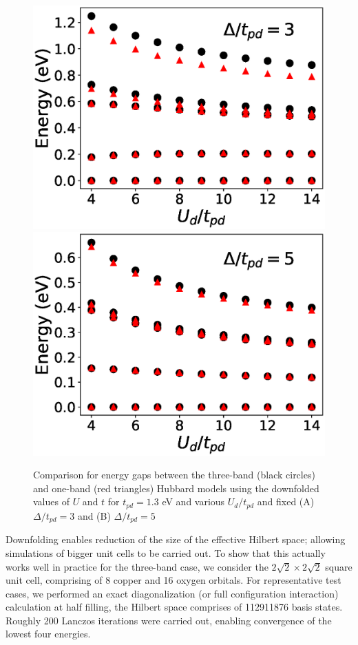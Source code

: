 \begin{figure}
\centering
\includegraphics[width=0.49\linewidth]{./Figures/lowenergy_1and3_vs_Ud_ep_3.eps}
\includegraphics[width=0.49\linewidth]{./Figures/lowenergy_1and3_vs_Ud_ep_5.eps}
\caption{Comparison for energy gaps between the three-band (black circles) and one-band (red triangles) 
Hubbard models using the downfolded values of $U$ and $t$ for $t_{pd}=1.3$ eV and 
various $U_{d}/t_{pd}$ and fixed (A) $\Delta/t_{pd}=3$ and (B) $\Delta/t_{pd}=5$}
\label{fig:energyfit} 
\end{figure}	
Downfolding enables reduction of the size of the effective Hilbert space; allowing 
simulations of bigger unit cells to be carried out. To show that this actually works well in practice for the three-band case, 
we consider the $2\sqrt{2} \times 2 \sqrt{2}$ square unit cell, comprising of 8 copper and 16 oxygen orbitals. 
For representative test cases, we performed an exact diagonalization 
(or full configuration interaction) calculation at half filling, the Hilbert space comprises of 112911876 basis states. 
Roughly 200 Lanczos iterations were carried out, enabling convergence of the lowest four energies. 

